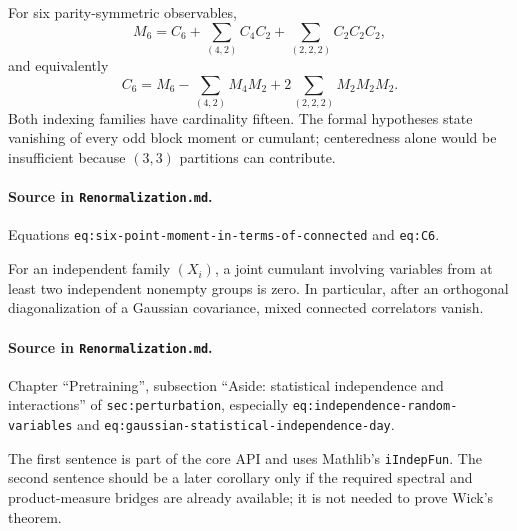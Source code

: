 \begin{theorem}
\label{thm:renorm:sixPointDecomposition}
For six parity-symmetric observables,
\[
 M_6=C_6+\sum_{(4,2)}C_4C_2+\sum_{(2,2,2)}C_2C_2C_2,
\]
and equivalently
\[
 C_6=M_6-\sum_{(4,2)}M_4M_2+2\sum_{(2,2,2)}M_2M_2M_2.
\]
Both indexing families have cardinality fifteen.  The formal hypotheses state vanishing of every
odd block moment or cumulant; centeredness alone would be insufficient because $(3,3)$ partitions
can contribute.

\paragraph{Source in \texttt{Renormalization.md}.}
Equations \texttt{eq:six-point-moment-in-terms-of-connected} and \texttt{eq:C6}.
\end{theorem}

\begin{proposition}
\label{prop:renorm:independentCumulant}
For an independent family $(X_i)$, a joint cumulant involving variables from at least two
independent nonempty groups is zero.  In particular, after an orthogonal diagonalization of a
Gaussian covariance, mixed connected correlators vanish.

\paragraph{Source in \texttt{Renormalization.md}.}
Chapter ``Pretraining'', subsection ``Aside: statistical independence and interactions'' of
\texttt{sec:perturbation}, especially \texttt{eq:independence-random-variables} and
\texttt{eq:gaussian-statistical-independence-day}.
\end{proposition}

The first sentence is part of the core API and uses Mathlib's \texttt{iIndepFun}.  The second
sentence should be a later corollary only if the required spectral and product-measure bridges are
already available; it is not needed to prove Wick's theorem.

